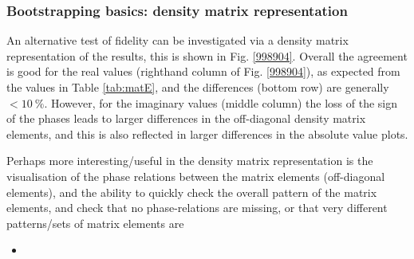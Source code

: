 \subsubsection{Bootstrapping basics: density matrix representation}

An alternative test of fidelity can be investigated via a density matrix representation of the results, this is shown in Fig. \ref{998904}. Overall the agreement is good for the real values (righthand column of Fig. \ref{998904}), as expected from the values in Table \ref{tab:matE}, and the differences (bottom row) are generally $<10~\%$. However, for the imaginary values (middle column) the loss of the sign of the phases leads to larger differences in the off-diagonal density matrix elements, and this is also reflected in larger differences in the absolute value plots.

Perhaps more interesting/useful in the density matrix representation is the visualisation of the phase relations between the matrix elements (off-diagonal elements), and the ability to quickly check the overall pattern of the matrix elements, and check that no phase-relations are missing, or that very different patterns/sets of matrix elements are 


\begin{itemize}
\item 
\end{itemize}